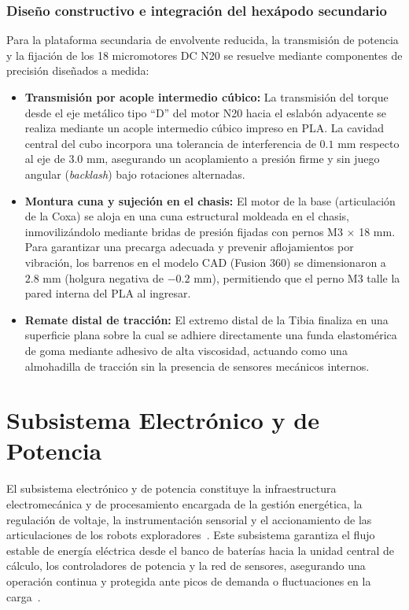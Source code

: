\subsubsection{Diseño constructivo e integración del hexápodo secundario}

\hspace{1.25cm}
Para la plataforma secundaria de envolvente reducida, la transmisión de potencia y la fijación de los 18 micromotores DC N20 se resuelve mediante componentes de precisión diseñados a medida:

\begin{itemize}
    \item \textbf{Transmisión por acople intermedio cúbico:} La transmisión del torque desde el eje metálico tipo ``D'' del motor N20 hacia el eslabón adyacente se realiza mediante un acople intermedio cúbico impreso en PLA. La cavidad central del cubo incorpora una tolerancia de interferencia de $0.1\text{ mm}$ respecto al eje de $3.0\text{ mm}$, asegurando un acoplamiento a presión firme y sin juego angular (\textit{backlash}) bajo rotaciones alternadas.
    \item \textbf{Montura cuna y sujeción en el chasis:} El motor de la base (articulación de la Coxa) se aloja en una cuna estructural moldeada en el chasis, inmovilizándolo mediante bridas de presión fijadas con pernos M3 $\times$ 18 mm. Para garantizar una precarga adecuada y prevenir aflojamientos por vibración, los barrenos en el modelo CAD (Fusion 360) se dimensionaron a $2.8\text{ mm}$ (holgura negativa de $-0.2\text{ mm}$), permitiendo que el perno M3 talle la pared interna del PLA al ingresar.
    \item \textbf{Remate distal de tracción:} El extremo distal de la Tibia finaliza en una superficie plana sobre la cual se adhiere directamente una funda elastomérica de goma mediante adhesivo de alta viscosidad, actuando como una almohadilla de tracción sin la presencia de sensores mecánicos internos.
\end{itemize}

\section{Subsistema Electrónico y de Potencia}

El subsistema electrónico y de potencia constituye la infraestructura electromecánica y de procesamiento encargada de la gestión energética, la regulación de voltaje, la instrumentación sensorial y el accionamiento de las articulaciones de los robots exploradores~\cite{Reumann2012}. Este subsistema garantiza el flujo estable de energía eléctrica desde el banco de baterías hacia la unidad central de cálculo, los controladores de potencia y la red de sensores, asegurando una operación continua y protegida ante picos de demanda o fluctuaciones en la carga~\cite{Reumann2012}.

